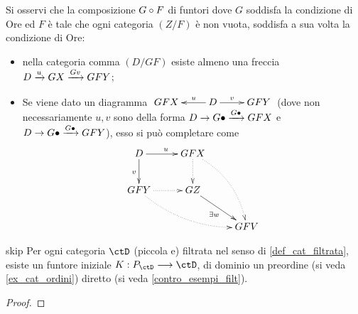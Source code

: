 Si osservi che la composizione \(G\circ F\) di funtori dove \(G\) soddisfa la condizione di Ore ed \(F\) è tale che ogni categoria \((Z/F)\) è non vuota, soddisfa a sua volta la condizione di Ore:
\begin{itemize}
	\item nella categoria comma \((D/GF)\) esiste almeno una freccia \(D \xrightarrow{u} GX \xrightarrow{Gv} GFY\);
	\item Se viene dato un diagramma \(\xymatrix{GFX & \ar[l]_-u D\ar[r]^-v & GFY}\) (dove non necessariamente \(u,v\) sono della forma \(D\to G\bullet\xrightarrow{G\bullet}GFX\) e \(D\to G\bullet\xrightarrow{G\bullet}GFY\)), esso si può completare come
	      \[\xymatrix{
		      D \ar[r]^u\ar[d]_v& GFX\ar@{.>}[d]\ar@{.>}@/^1pc/[ddr]\\
		      GFY \ar@{.>}[r]\ar@{.>}@/_1pc/[drr] & GZ\ar[dr]_{\exists w} \\
		      && GFV
		      }\]
\end{itemize}
\begin{hTheorem}{skip}
	Per ogni categoria \(\ctD\) (piccola e) filtrata nel senso di \ref{def_cat_filtrata}, esiste un funtore iniziale \(K : P_\ctD\fun\ctD\), di dominio un preordine (si veda \ref{ex_cat_ordini}) diretto (si veda \ref{contro_esempi_filt}).
\end{hTheorem}
\begin{proof}
	\Todo{}
\end{proof}

